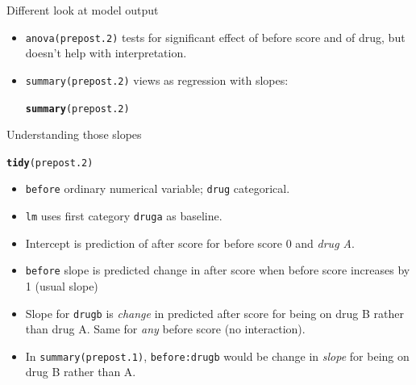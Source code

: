 \documentclass[unknownkeysallowed]{beamer}\usepackage[]{graphicx}\usepackage[]{color}
\makeatletter
\newcommand{\hlstd}[1]{\textcolor[rgb]{0.345,0.345,0.345}{#1}}%
\newcommand{\hlkwd}[1]{\textcolor[rgb]{0.737,0.353,0.396}{\textbf{#1}}}%
\newenvironment{kframe}{%
 \def\at@end@of@kframe{}%
 \ifinner\ifhmode%
  \def\at@end@of@kframe{\end{minipage}}%
  \begin{minipage}{\columnwidth}%
 \fi\fi%
 \def\FrameCommand##1{\hskip\@totalleftmargin \hskip-\fboxsep
 \colorbox{shadecolor}{##1}\hskip-\fboxsep
     \hskip-\linewidth \hskip-\@totalleftmargin \hskip\columnwidth}%
 \MakeFramed {\advance\hsize-\width
   \@totalleftmargin\z@ \linewidth\hsize
   \@setminipage}}%
 {\par\unskip\endMakeFramed%
 \at@end@of@kframe}
\newenvironment{knitrout}{}{} %
\makeatother
\begin{document}
\begin{frame}[fragile]{Different look at model output}
  
  \begin{itemize}
  \item \texttt{anova(prepost.2)} tests for significant effect of
    before score and of drug, but doesn't help with interpretation.
  \item \texttt{summary(prepost.2)} views as regression with slopes:
    
    \begin{scriptsize}
\begin{knitrout}
\color{fgcolor}\begin{kframe}
\begin{alltt}
\hlkwd{summary}\hlstd{(prepost.2)}
\end{alltt}


{\ttfamily\noindent\bfseries\color{errorcolor}{\#\# Error in summary(prepost.2): object 'prepost.2' not found}}\end{kframe}
\end{knitrout}
    \end{scriptsize}
  \end{itemize}
  
\end{frame}

\begin{frame}[fragile]{Understanding those slopes}
  
\begin{knitrout}\footnotesize
{}\color{fgcolor}\begin{kframe}
\begin{alltt}
\hlkwd{tidy}\hlstd{(prepost.2)}
\end{alltt}


{\ttfamily\noindent\bfseries\color{errorcolor}{\#\# Error in tidy(prepost.2): object 'prepost.2' not found}}\end{kframe}
\end{knitrout}

\begin{itemize}
\item \texttt{before} ordinary numerical variable; \texttt{drug}
  categorical. 
\item \texttt{lm} uses first category \texttt{druga} as baseline.
\item Intercept is prediction of after score for before score 0 and
  \emph{drug A}.
\item \texttt{before} slope is predicted change in after score when
  before score increases by 1 (usual slope)
\item Slope for \texttt{drugb} is \emph{change} in predicted after
  score for being on drug B rather than drug A. Same for \emph{any}
  before score (no interaction).
\item In \texttt{summary(prepost.1)}, \texttt{before:drugb} would be change in
  \emph{slope} for being on drug B rather than A.
  
\end{itemize}

  
\end{frame}
\end{document}
